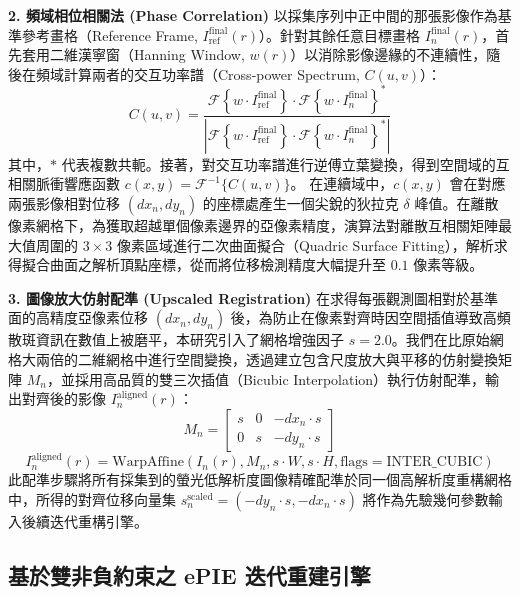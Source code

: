 \textbf{2. 頻域相位相關法 (Phase Correlation)}
以採集序列中正中間的那張影像作為基準參考畫格（Reference Frame, $I^{\text{final}}_{\text{ref}}(r)$）。針對其餘任意目標畫格 $I^{\text{final}}_n(r)$，首先套用二維漢寧窗（Hanning Window, $w(r)$）以消除影像邊緣的不連續性，隨後在頻域計算兩者的交互功率譜（Cross-power Spectrum, $C(u, v)$）：
\begin{equation}
    C(u, v) = \frac{\mathcal{F}\left\{ w \cdot I^{\text{final}}_{\text{ref}} \right\} \cdot \mathcal{F}\left\{ w \cdot I^{\text{final}}_n \right\}^*}{\left| \mathcal{F}\left\{ w \cdot I^{\text{final}}_{\text{ref}} \right\} \cdot \mathcal{F}\left\{ w \cdot I^{\text{final}}_n \right\}^* \right|}
\end{equation}
其中，$*$ 代表複數共軛。接著，對交互功率譜進行逆傅立葉變換，得到空間域的互相關脈衝響應函數 $c(x, y) = \mathcal{F}^{-1}\{C(u, v)\}$。
在連續域中，$c(x, y)$ 會在對應兩張影像相對位移 $(dx_n, dy_n)$ 的座標處產生一個尖銳的狄拉克 $\delta$ 峰值。在離散像素網格下，為獲取超越單個像素邊界的亞像素精度，演算法對離散互相關矩陣最大值周圍的 $3 \times 3$ 像素區域進行二次曲面擬合（Quadric Surface Fitting），解析求得擬合曲面之解析頂點座標，從而將位移檢測精度大幅提升至 $0.1$ 像素等級。

\textbf{3. 圖像放大仿射配準 (Upscaled Registration)}
在求得每張觀測圖相對於基準面的高精度亞像素位移 $(dx_n, dy_n)$ 後，為防止在像素對齊時因空間插值導致高頻散斑資訊在數值上被磨平，本研究引入了網格增強因子 $s = 2.0$。我們在比原始網格大兩倍的二維網格中進行空間變換，透過建立包含尺度放大與平移的仿射變換矩陣 $M_n$，並採用高品質的雙三次插值（Bicubic Interpolation）執行仿射配準，輸出對齊後的影像 $I_n^{\text{aligned}}(r)$：
\begin{equation}
    M_n = \begin{bmatrix} s & 0 & -dx_n \cdot s \\ 0 & s & -dy_n \cdot s \end{bmatrix}
\end{equation}
\begin{equation}
    I_n^{\text{aligned}}(r) = \text{WarpAffine}\left( I_n(r), M_n, s\cdot W, s\cdot H, \text{flags}=\text{INTER\_CUBIC} \right)
\end{equation}
此配準步驟將所有採集到的螢光低解析度圖像精確配準於同一個高解析度重構網格中，所得的對齊位移向量集 $s_n^{\text{scaled}} = (-dy_n \cdot s, -dx_n \cdot s)$ 將作為先驗幾何參數輸入後續迭代重構引擎。

\subsection{基於雙非負約束之 ePIE 迭代重建引擎}

